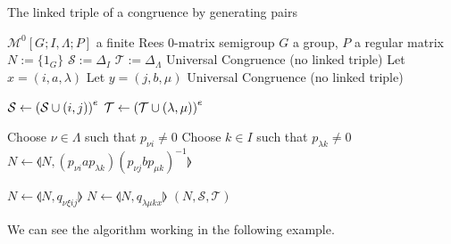 \begin{algorithm}
\caption{The linked triple of a congruence by generating pairs}
\label{alg:pairs-to-linked-triple}
\begin{algorithmic}[1]
    \Require $\mathcal{M}^0[G;I,\Lambda;P]$ a finite Rees 0-matrix semigroup
    \Require $G$ a group, $P$ a regular matrix
      \State $N := \{1_G\}$
      \State $\mathcal{S} := \Delta_I$
      \State $\mathcal{T} := \Delta_\Lambda$
          \State \Continue
          \State \Return Universal Congruence (no linked triple)
        \EndIf
        \State Let $x=(i,a,\lambda)$
        \State Let $y=(j,b,\mu)$
          \State \Return Universal Congruence (no linked triple)
        \EndIf

        \State $\mathcal{S} \gets \left(\mathcal{S} \cup (i,j)\right)^e$
        \State $\mathcal{T} \gets \left(\mathcal{T} \cup (\lambda, \mu)\right)^e$

        \State Choose $\nu \in \Lambda$ such that $p_{\nu i} \neq 0$
        \State Choose $k \in I$ such that $p_{\lambda k} \neq 0$
        \State $N \gets \llangle N, (p_{\nu i}ap_{\lambda k})(p_{\nu j}bp_{\mu k})^{-1} \rrangle$

          \State $N \gets \llangle N, q_{\nu \xi i j} \rrangle$
        \EndFor
          \State $N \gets \llangle N, q_{\lambda \mu k x} \rrangle$
        \EndFor
      \EndFor
      \State \Return $(N,\mathcal{S},\mathcal{T})$
    \EndProcedure
\end{algorithmic}
\end{algorithm}

We can see the algorithm working in the following example.

